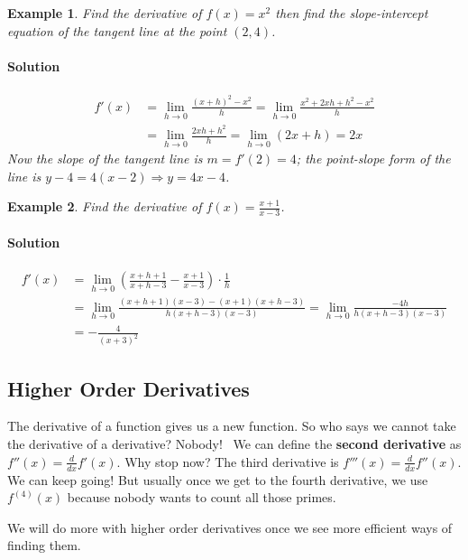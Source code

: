 \documentclass[letterpaper, 11pt, openany]{book}
\theoremstyle{mytheoremstyle}
\theoremstyle{myexamplestyle}
\newtheorem{example}{Example}[section]
\newenvironment{solution}{\paragraph{\sffamily \smaller \fontseries{b}\selectfont Solution}}{\hfill\faSquare}
\begin{document}
\begin{example}\label{e:def-deriv-parabola}
    Find the derivative of \(f(x) = x^{2}\) then find the slope-intercept equation of the tangent line at the point \((2,4)\).
    \begin{solution}
        \begin{align*}
            f'(x)   &= \lim_{h \to 0} \frac{(x+h)^{2} - x^{2}}{h} = \lim_{h \to 0} \frac{x^{2} + 2xh + h^{2} - x^2}{h} \\
                    &= \lim_{h \to 0} \frac{2xh + h^{2}}{h} = \lim_{h \to 0} (2x + h) = 2x
        \end{align*}
    Now the slope of the tangent line is \(m = f'(2) = 4\); the point-slope form of the line is \(y - 4 = 4(x-2) \Rightarrow y = 4x - 4\).
    \end{solution}
\end{example}

\begin{example}\label{e:def-deriv-rational}
    Find the derivative of \(\displaystyle f(x) = \frac{x+1}{x-3}\).
    \begin{solution}
        \begin{align*}
            f'(x)   &= \lim_{h \to 0} \left(\frac{x+h+1}{x+h-3} - \frac{x+1}{x-3}\right)\cdot \frac{1}{h} \\
                    &= \lim_{h \to 0} \frac{(x+h+1)(x-3) - (x+1)(x+h-3)}{h(x+h-3)(x-3)} = \lim_{h \to 0} \frac{-4h}{h(x+h-3)(x-3)}\\
                    &= {-}\frac{4}{(x+3)^{2}}
        \end{align*}
    \end{solution}
\end{example}

\subsection{Higher Order Derivatives}
The derivative of a function gives us a new function. So who says we cannot take the derivative of a derivative? Nobody! \faSmile \ We can define the \textbf{second derivative} as \(f''(x) = \frac{d}{dx}f'(x)\). Why stop now? The third derivative is \(f'''(x) = \frac{d}{dx}f''(x)\). We can keep going! But usually once we get to the fourth derivative, we use \(f^{(4)}(x)\) because nobody wants to count all those primes.

We will do more with higher order derivatives once we see more efficient ways of finding them.
\end{document}

